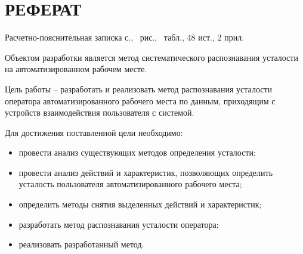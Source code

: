 \section*{РЕФЕРАТ}

Расчетно-пояснительная записка \pageref{LastPage} с., \totalfigures\ рис., \totaltables\ табл., 48 ист., 2 прил.

Объектом разработки является метод систематического распознавания усталости на автоматизированном рабочем месте.

Цель работы -- разработать и реализовать метод распознавания усталости оператора автоматизированного рабочего места по данным, приходящим с устройств взаимодействия пользователя с системой.

Для достижения поставленной цели необходимо:
\begin{itemize}
\item провести анализ существующих методов определения усталости;
\item провести анализ действий и характеристик, позволяющих определить усталость пользователя автоматизированного рабочего места;
\item определить методы снятия выделенных действий и характеристик;
\item разработать метод распознавания усталости оператора;
\item реализовать разработанный метод.
\end{itemize}

\pagebreak